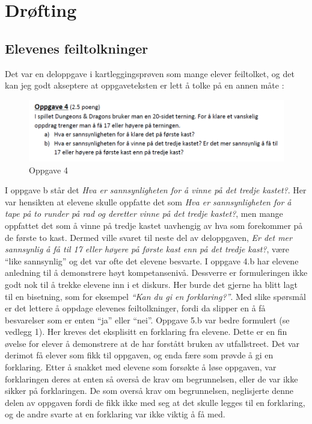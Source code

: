 \documentclass[main.tex]{subfiles}
\begin{document}
\section*{Drøfting}
\label{sec:5}

\subsection*{Elevenes feiltolkninger}
Det var en deloppgave i kartleggingsprøven som mange elever feiltolket, og det kan jeg godt
akseptere at oppgaveteksten er lett å tolke på en annen måte :
\par
\begin{figure}[h!]
\centering
\includegraphics[scale = 0.7]{../figures/oppgave4b.png}
\caption{Oppgave 4}
\label{fig:oppgave4}
\end{figure}
I oppgave b står det \emph{Hva er sannsynligheten for å vinne på det tredje kastet?}. Her var hensikten at
elevene skulle oppfatte det som \emph{Hva er sannsynligheten for å tape på to runder på rad og deretter vinne på 
det tredje kastet?}, men mange oppfattet det som å vinne på tredje kastet uavhengig av hva som forekommer på de 
første to kast. Dermed ville svaret til neste del av deloppgaven, \emph{Er det mer sannsynlig å få til 17 eller 
høyere på første kast enn på det tredje kast?},  være ``like sannsynlig'' og det var ofte det elevene besvarte. 
I oppgave 4.b har elevene anledning til å demonstrere høyt kompetansenivå. Dessverre er formuleringen ikke
godt nok til å trekke elevene inn i et diskurs. Her burde det gjerne ha blitt lagt til en bisetning, som 
for eksempel \emph{``Kan du gi en forklaring?''}. Med slike spørsmål er det lettere å oppdage elevenes
feiltolkninger, fordi da slipper en å få besvarelser som er enten ``ja'' eller ``nei''. Oppgave 
5.b var bedre formulert (se vedlegg 1). Her kreves det eksplisitt en forklaring fra elevene.
Dette er en fin øvelse for elever å demonstrere at de har forstått bruken av utfallstreet. Det var derimot
få elever som fikk til oppgaven, og enda fære som prøvde å gi en forklaring. Etter å snakket med elevene
som forsøkte å løse oppgaven, var forklaringen deres at enten så overså de krav om begrunnelsen, eller de var
ikke sikker på forklaringen. De som overså krav om begrunnelsen, neglisjerte denne delen av oppgaven fordi
de fikk ikke med seg at det skulle legges til en forklaring, og de andre svarte at en forklaring var ikke
viktig å få med. 
\end{document}

